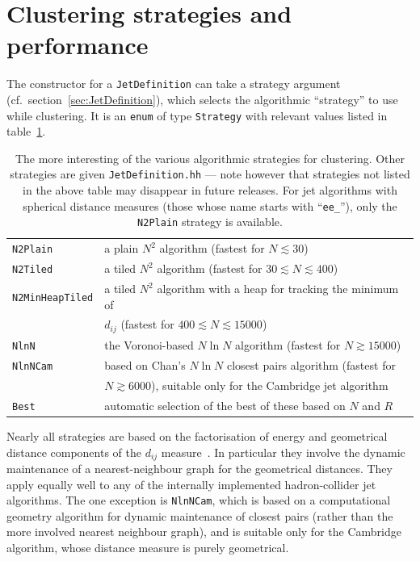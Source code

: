 \documentclass[12pt,a4]{article}
\newcommand{\ttt}[1]{{\small\texttt{#1}}}
\begin{document}
\section{Clustering strategies and performance}
\label{app:strategies}

The constructor for a \ttt{JetDefinition} can take a strategy argument
(cf.\ section~\ref{sec:JetDefinition}), which selects the algorithmic
``strategy'' to use while clustering.
%
It is an \ttt{enum} of type \ttt{Strategy} with relevant
values listed in table~\ref{tab:Strategies}.
%
\begin{table}
  \begin{center}
    \begin{tabular}{ll}\toprule
      \ttt{N2Plain} & a plain $N^2$ algorithm (fastest for $N
      \lesssim 30$)\\
      \ttt{N2Tiled} & a tiled $N^2$ algorithm (fastest for $30 \lesssim
      N \lesssim 400$)\\ 
      \ttt{N2MinHeapTiled} & a tiled $N^2$ algorithm with a heap for
      tracking the minimum of \\& $d_{ij}$ (fastest for $400 \lesssim
      N \lesssim 15000$)\\ 
      \ttt{NlnN} & the Voronoi-based $N\ln N$ algorithm (fastest for $
      N \gtrsim 15000$)\\ 
      \ttt{NlnNCam} & based on Chan's $N\ln N$ closest pairs
      algorithm (fastest for \\&$ 
      N \gtrsim 6000$), suitable only for the Cambridge jet algorithm\\ 
      \ttt{Best} & automatic selection of the best of these based on
      $N$ and $R$\\\bottomrule
    \end{tabular}
    \caption{The more interesting of the various algorithmic
      strategies for clustering. Other strategies are given
      \ttt{JetDefinition.hh} --- note however that strategies not
      listed in the above table may disappear in future releases.
      For jet algorithms with spherical distance measures (those whose
      name starts with ``\ttt{ee\_}''), only the \ttt{N2Plain} strategy is
      available.  }
    \label{tab:Strategies}
  \end{center}
\end{table}
%
Nearly all strategies are based on the factorisation of energy and
geometrical distance components of the $d_{ij}$
measure~\cite{fastjet}. In particular they involve the dynamic
maintenance of a nearest-neighbour graph for the geometrical
distances.  They apply equally well to any of the internally
implemented hadron-collider jet algorithms.
%
The one exception is \ttt{NlnNCam}, which is based on a computational
geometry algorithm for dynamic maintenance of closest pairs
\cite{Chan} (rather than the more involved nearest neighbour graph),
and is suitable only for the Cambridge algorithm, whose distance
measure is purely geometrical.
\end{document}
